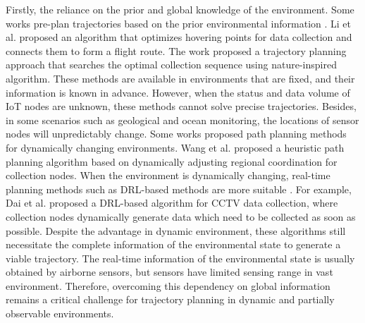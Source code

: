 \documentclass[conference]{IEEEtran}
\begin{document}
Firstly, the reliance on the prior and global knowledge of the environment. Some works pre-plan trajectories based on the prior environmental information \cite{YLi23,JLi20,MLi23,TWang22}. Li et al. proposed an algorithm that optimizes hovering points for data collection and connects them to form a flight route\cite{YLi23}. The work \cite{TWang22} proposed a trajectory planning approach that searches the optimal collection sequence using nature-inspired algorithm. These methods are available in environments that are fixed, and their information is known in advance. However, when the status and data volume of IoT nodes are unknown, these methods cannot solve precise trajectories. Besides, in some scenarios such as geological and ocean monitoring, the locations of sensor nodes will unpredictably change. Some works proposed path planning methods for dynamically changing environments. Wang et al. \cite{TWang24} proposed a heuristic path planning algorithm based on dynamically adjusting regional coordination for collection nodes. 
When the environment is dynamically changing, real-time planning methods such as DRL-based methods are more suitable \cite{ZDai23,XXie23}. For example, Dai et al. \cite{ZDai23} proposed a DRL-based algorithm for CCTV data collection, where collection nodes dynamically generate data which need to be collected as soon as possible. Despite the advantage in dynamic environment, these algorithms still necessitate the complete information of the environmental state to generate a viable trajectory. The real-time information of the environmental state is usually obtained by airborne sensors, but sensors have limited sensing range in vast environment. Therefore, overcoming this dependency on global information remains a critical challenge for trajectory planning in dynamic and partially observable environments. 

\end{document}
